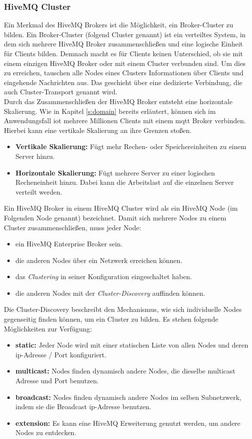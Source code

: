 \subsubsection{HiveMQ Cluster} \label{s:hivemq-cluster}
Ein Merkmal des HiveMQ Brokers ist die Möglichkeit, ein Broker-Cluster zu bilden.
Ein Broker-Cluster (folgend Cluster genannt) ist ein verteiltes System, in dem sich mehrere HiveMQ Broker zusammenschlie{\ss}en und eine logische Einheit für Clients bilden.
Demnach macht es für Clients keinen Unterschied, ob sie mit einem einzigen HiveMQ Broker oder mit einem Cluster verbunden sind.
Um dies zu erreichen, tauschen alle Nodes eines Clusters Informationen über Clients und eingehende Nachrichten aus. Das geschieht über eine dedizierte Verbindung, die auch Cluster-Transport genannt wird.
\cite{HiveMQClusterHiveMQ}
\\
Durch das Zusammenschlie{\ss}en der HiveMQ Broker entsteht eine horizontale Skalierung. Wie in Kapitel \ref{s:domain} bereits erläutert, können sich im Anwendungsfall \ac{iot} mehrere Millionen Clients mit einem \ac{mqtt} Broker verbinden. Hierbei kann eine vertikale Skalierung an ihre Grenzen sto{\ss}en.
\cite{HowScaleIT}
\begin{itemize}
    \item \textbf{Vertikale Skalierung:} Fügt mehr Rechen- oder Speichereinheiten zu einem Server hinzu.
    \item \textbf{Horizontale Skalierung:} Fügt mehrere Server zu einer logischen Recheneinheit hinzu. Dabei kann die Arbeitslast auf die einzelnen Server verteilt werden.
\end{itemize}
Ein HiveMQ Broker in einem HiveMQ Cluster wird als ein HiveMQ Node (im Folgenden Node genannt) bezeichnet.
Damit sich mehrere Nodes zu einem Cluster zusammenschlie{\ss}en, muss jeder Node:
\begin{itemize}
    \item ein HiveMQ Enterprise Broker sein.
    \item die anderen Nodes über ein Netzwerk erreichen können.
    \item das \textit{Clustering} in seiner Konfiguration eingeschaltet haben.
    \item die anderen Nodes mit der \textit{Cluster-Discovery} auffinden können.
\end{itemize}
Die Cluster-Discovery beschreibt den Mechanismus, wie sich individuelle Nodes gegenseitig finden können, um ein Cluster zu bilden. Es stehen folgende Möglichkeiten zur Verfügung:
\begin{itemize}
    \item \textbf{static:} Jeder Node wird mit einer statischen Liste von allen Nodes und deren \acs{ip}-Adresse / Port konfiguriert.
    \item \textbf{multicast:} Nodes finden dynamisch andere Nodes, die dieselbe multicast Adresse und Port benutzen.
    \item \textbf{broadcast:} Nodes finden dynamisch andere Nodes im selben Subnetzwerk, indem sie die Broadcast \acs{ip}-Adresse benutzen.
    \item \textbf{extension:} Es kann eine HiveMQ Erweiterung genutzt werden, um andere Nodes zu entdecken.
\end{itemize}
